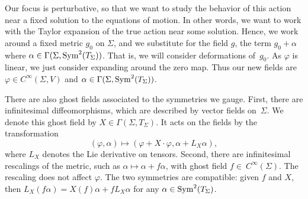 Our focus is perturbative, so that we want to study the behavior of this action near a fixed solution to the equations of motion.
In other words, we want to work with the Taylor expansion of the true action near some solution.
Hence, we work around a fixed metric $g_0$ on $\Sigma$, 
and we substitute for the field $g$,
the term $g_0+\alpha$ where $\alpha \in \Gamma(\Sigma,{\rm Sym}^2(T_\Sigma))$.
That is, we will consider deformations of~$g_0$.
As $\varphi$ is linear, we just consider expanding around the zero map.
Thus our new fields are $\varphi \in C^\infty(\Sigma,V)$ and $\alpha \in \Gamma(\Sigma,{\rm Sym}^2(T_\Sigma))$.

There are also ghost fields associated to the symmetries we gauge.
First, there are infinitesimal diffeomorphisms,  which are described by vector fields on~$\Sigma$.
We denote this ghost field by $X \in \Gamma(\Sigma,T_\Sigma)$.
It acts on the fields by the transformation 
\[
(\varphi,\alpha) \mapsto (\varphi + X \cdot \varphi, \alpha + L_X \alpha), 
\]
where $L_X$ denotes the Lie derivative on tensors.
Second, there are infinitesimal rescalings of the metric, 
such as $\alpha \mapsto \alpha + f \alpha$, 
with ghost field $f \in~C^\infty(\Sigma)$.
The rescaling does not affect $\varphi$.
The two symmetries are compatible: 
given $f$ and $X$, then $L_{X} (f \alpha) = X(f) \alpha + f L_X \alpha$ for any $\alpha \in {\rm Sym}^2(T_\Sigma)$.

